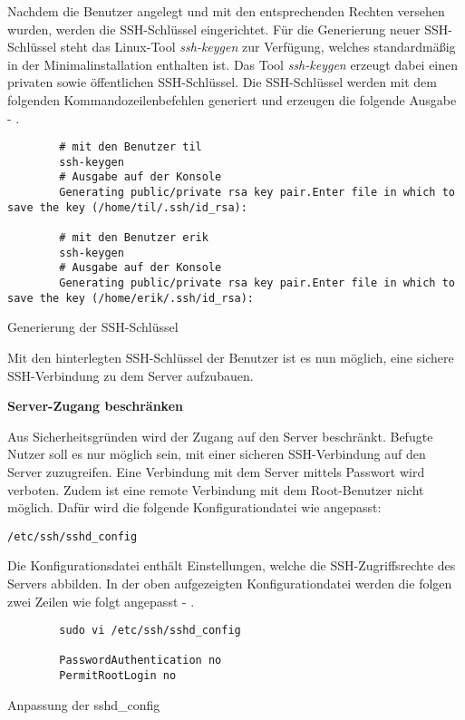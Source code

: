 \newpage

Nachdem die Benutzer angelegt und mit den entsprechenden Rechten versehen wurden, werden die \ac{SSH}-Schlüssel eingerichtet.
Für die Generierung neuer \ac{SSH}-Schlüssel steht das Linux-Tool \textit{ssh-keygen} zur Verfügung, welches standardmäßig in der Minimalinstallation enthalten ist.
Das Tool \textit{ssh-keygen} erzeugt dabei einen privaten sowie öffentlichen \ac{SSH}-Schlüssel.
Die \ac{SSH}-Schlüssel werden mit dem folgenden Kommandozeilenbefehlen generiert und erzeugen die folgende Ausgabe - .
\begin{code}
    \begin{verbatim}
        # mit den Benutzer til
        ssh-keygen
        # Ausgabe auf der Konsole
        Generating public/private rsa key pair.Enter file in which to save the key (/home/til/.ssh/id_rsa):

        # mit den Benutzer erik
        ssh-keygen
        # Ausgabe auf der Konsole
        Generating public/private rsa key pair.Enter file in which to save the key (/home/erik/.ssh/id_rsa): 
    \end{verbatim}
    \caption[Generierung der SSH-Schlüssel]{Generierung der SSH-Schlüssel}
    \label{Generierung der SSH-Schlüssel}
\end{code}

Mit den hinterlegten \ac{SSH}-Schlüssel der Benutzer ist es nun möglich, eine sichere SSH-Verbindung zu dem Server aufzubauen.

\textbf{Server-Zugang beschränken}

Aus Sicherheitsgründen wird der Zugang auf den Server beschränkt.
Befugte Nutzer soll es nur möglich sein, mit einer sicheren SSH-Verbindung auf den Server zuzugreifen.
Eine Verbindung mit dem Server mittels Passwort wird verboten.
Zudem ist eine remote Verbindung mit dem Root-Benutzer nicht möglich.
Dafür wird die folgende Konfigurationdatei wie angepasst:

\texttt{/etc/ssh/sshd_config}

Die Konfigurationsdatei enthält Einstellungen, welche die SSH-Zugriffsrechte des Servers abbilden.
In der oben aufgezeigten Konfigurationdatei werden die folgen zwei Zeilen wie folgt angepasst - .

\begin{code}[H]
    \begin{verbatim}
        sudo vi /etc/ssh/sshd_config

        PasswordAuthentication no
        PermitRootLogin no
    \end{verbatim}
    \caption[Anpassung der sshd\_config]{Anpassung der sshd\_config}
    \label{Anpassung der sshd_config}
\end{code}

